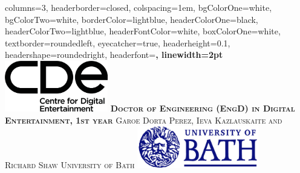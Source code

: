 \documentclass[landscape,a0paper,fontscale=0.285]{baposter} %
\begin{document}
\begin{poster}
{
columns=3,
headerborder=closed, %
colspacing=1em, %
bgColorOne=white, %
bgColorTwo=white, %
borderColor=lightblue, %
headerColorOne=black, %
headerColorTwo=lightblue, %
headerFontColor=white, %
boxColorOne=white, %
textborder=roundedleft, %
eyecatcher=true, %
headerheight=0.1\textheight, %
headershape=roundedright, %
headerfont=\Large\bf\textsc, %
linewidth=2pt %
}
%
{\includegraphics[height=6em]{cde_tag_black.png}} %
{\bf\textsc{Doctor of Engineering (EngD) in Digital Entertainment, 1st year}\vspace{0.5em}} %
{\textsc{ Garoe Dorta Perez, Ieva Kazlauskaite and Richard Shaw  \hspace{12pt} University of Bath}} %
{\includegraphics[height=5em]{Bathlogo.jpg}} %


\end{poster}
\end{document}
